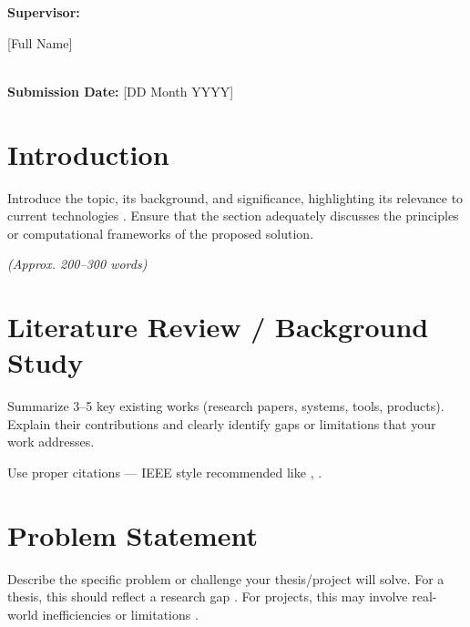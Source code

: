\documentclass[12pt,a4paper]{article}
\begin{document}
\begin{titlepage}
\begin{center}
\vfill

{\bfseries Supervisor:}

\vspace{0.08in}

[Full Name]\\
[Designation]\\
[Department Name]

\vfill

{\bfseries Submission Date:} [DD Month YYYY]

\end{center}

\end{titlepage}



\setcounter{page}{1}

\section{Introduction}

Introduce the topic, its background, and significance, highlighting its
relevance to current technologies \cite{james2021intro}. Ensure that the section adequately discusses the principles or computational frameworks of the proposed solution.

\vspace{0.1in}

\textit{(Approx. 200--300 words)}

\vspace{0.15in}


\section{Literature Review / Background Study}

Summarize 3--5 key existing works (research papers, systems, tools,
products). Explain their contributions and clearly identify gaps or
limitations that your work addresses.

Use proper citations --- IEEE style recommended like \cite{hasan2023thesis}, \cite{rahman2024ai}.


\section{Problem Statement}

Describe the specific problem or challenge your thesis/project will solve.
For a thesis, this should reflect a research gap \cite{uci2025dataset}. For projects, this may
involve real-world inefficiencies or limitations \cite{smith2023ml}.
\end{document}
